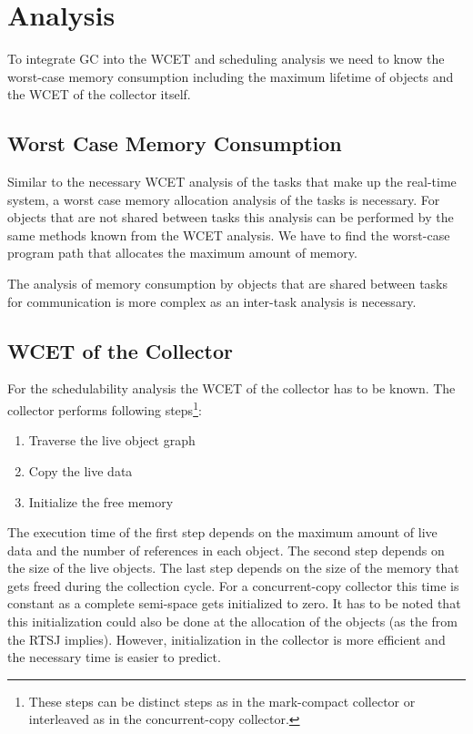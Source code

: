 \section{Analysis}

To integrate GC into the WCET and scheduling analysis we need to
know the worst-case memory consumption including the maximum
lifetime of objects and the WCET of the collector itself.

\subsection{Worst Case Memory Consumption}

Similar to the necessary WCET analysis of the tasks that make up the
real-time system, a worst case memory allocation analysis of the
tasks is necessary. For objects that are not shared between tasks
this analysis can be performed by the same methods known from the
WCET analysis. We have to find the worst-case program path that
allocates the maximum amount of memory.

The analysis of memory consumption by objects that are shared
between tasks for communication is more complex as an inter-task
analysis is necessary.

\subsection{WCET of the Collector}

For the schedulability analysis the WCET of the collector has to be
known. The collector performs following steps\footnote{These steps
can be distinct steps as in the mark-compact collector or
interleaved as in the concurrent-copy collector.}:
\begin{enumerate}
    \item Traverse the live object graph
    \item Copy the live data
    \item Initialize the free memory
\end{enumerate}

The execution time of the first step depends on the maximum amount
of live data and the number of references in each object. The second
step depends on the size of the live objects. The last step depends
on the size of the memory that gets freed during the collection
cycle. For a concurrent-copy collector this time is constant as a
complete semi-space gets initialized to zero. It has to be noted
that this initialization could also be done at the allocation of the
objects (as the  from the RTSJ implies). However,
initialization in the collector is more efficient and the necessary
time is easier to predict.

